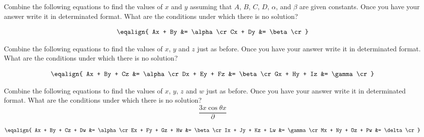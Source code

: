 



Combine the following equations to find the values of $x$ and $y$ assuming
that $A$, $B$, $C$, $D$, $\alpha$, and $\beta$ are given constants. Once you
have your answer write it in determinated format. What are the conditions
under which there is no solution?

$$
\eqalign{
Ax + By &= \alpha \cr
Cx + Dy &= \beta \cr
}
$$


Combine the following equations to find the values of $x$, $y$ and $z$ just as
before. Once you have your answer write it in determinated format. What are
the conditions under which there is no solution?

$$
\eqalign{
Ax + By + Cz &= \alpha \cr
Dx + Ey + Fz &= \beta \cr
Gx + Hy + Iz &= \gamma \cr
}
$$


Combine the following equations to find the values of $x$, $y$, $z$ and $w$
just as before. Once you have your answer write it in determinated format.
What are the conditions under which there is no solution?
$$
\frac{3x\cos \theta x}{\partial}
$$ 

$$
\eqalign{
Ax + By + Cz + Dw &= \alpha \cr
Ex + Fy + Gz + Hw &= \beta \cr
Ix + Jy + Kz + Lw &= \gamma \cr
Mx + Ny + Oz + Pw &= \delta \cr
}
$$

\bye
